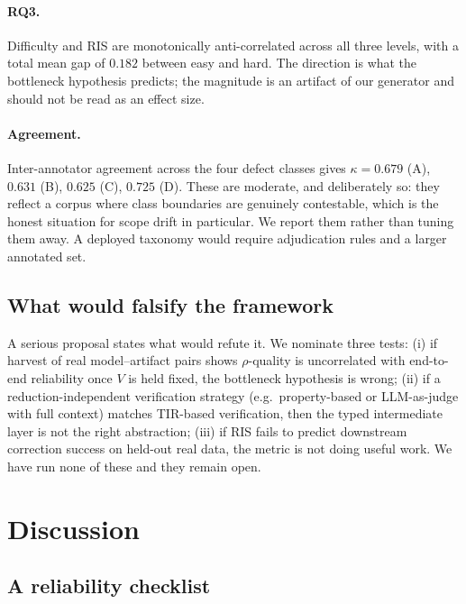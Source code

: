 \documentclass[11pt,a4paper]{article}
\theoremstyle{plain}
\theoremstyle{definition}
\newcommand{\RIS}{\textnormal{\textsc{RIS}}}
\begin{document}
\paragraph{RQ3.} Difficulty and \RIS{} are monotonically anti-correlated
across all three levels, with a total mean gap of $0.182$ between easy and
hard. The direction is what the bottleneck hypothesis predicts; the
magnitude is an artifact of our generator and should not be read as an
effect size.

\paragraph{Agreement.} Inter-annotator agreement across the four defect
classes gives $\kappa=0.679$ (A), $0.631$ (B), $0.625$ (C), $0.725$ (D).
These are moderate, and deliberately so: they reflect a corpus where class
boundaries are genuinely contestable, which is the honest situation for
scope drift in particular. We report them rather than tuning them away. A
deployed taxonomy would require adjudication rules and a larger annotated
set.

\subsection{What would falsify the framework}

A serious proposal states what would refute it. We nominate three tests:
(i) if harvest of real model--artifact pairs shows $\rho$-quality is
uncorrelated with end-to-end reliability once $V$ is held fixed, the
bottleneck hypothesis is wrong; (ii) if a reduction-independent verification
strategy (e.g.\ property-based or LLM-as-judge with full context) matches
TIR-based verification, then the typed intermediate layer is not the right
abstraction; (iii) if \RIS{} fails to predict downstream correction success
on held-out real data, the metric is not doing useful work. We have run
none of these and they remain open.

\section{Discussion}
\label{sec:discussion}

\subsection{A reliability checklist}
\end{document}
